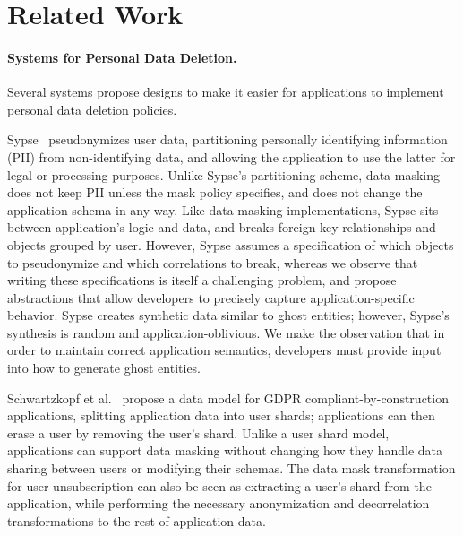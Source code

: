 \section{Related Work}
\label{sec:related}

\paragraph{Systems for Personal Data Deletion.}
Several systems propose designs to make it easier for applications to implement 
personal data deletion policies.

Sypse~\cite{sypse} pseudonymizes user data, partitioning personally identifying information (PII)
from non-identifying data, and allowing the application to use the latter for legal or processing
purposes. 
%
Unlike Sypse's partitioning scheme, data masking does not keep PII unless the mask policy specifies,
and does not change the application schema in any way.
%
Like data masking implementations, Sypse sits between application's logic and data, and breaks
foreign key relationships and objects grouped by user. However, Sypse assumes a specification of
which objects to pseudonymize and which correlations to break, whereas we observe that writing these
specifications is itself a challenging problem, and propose abstractions that allow developers to
precisely capture application-specific behavior. 
Sypse creates synthetic data similar to ghost entities; however, Sypse's synthesis is random and
application-oblivious. We make the observation that in order to maintain correct application
semantics, developers must provide input into how to generate ghost entities.


Schwartzkopf et al.~\cite{usershards} propose a data model for GDPR compliant-by-construction
applications, splitting application data into user shards; applications can then erase a user by
removing the user's shard. Unlike a user shard model, applications can support data masking without
changing how they handle data sharing between users or modifying their schemas. The data mask
transformation for user unsubscription can also be seen as extracting a user's shard from the
application, while performing the necessary anonymization and decorrelation transformations to the
rest of application data.

